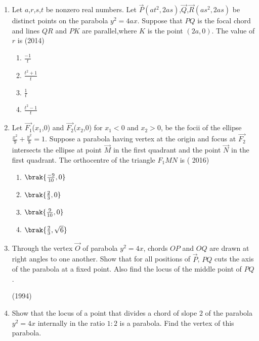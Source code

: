 \begin{enumerate}[label=\thesubsection.\arabic*.,ref=\thesubsection.\theenumi]
\begin{multicols}{4}
\begin{enumerate}
    \item $\frac{-2}{3}\sqrt{5}$
\end{enumerate}
\end{multicols}
\item Let $a$,$r$,$s$,$t$ be nonzero real numbers. Let $\Vec{P}$$(at^2,2as)$,$\Vec{Q}$,$\Vec{R}$$(as^2,2as)$ be distinct points on the parabola $y^2=4ax$. Suppose that $PQ$ is the focal chord and lines $QR$ and $PK$ are parallel,where $K$ is the point $(2a,0)$.
 The value of $r$ is 
\hfill(2014)
\begin{multicols}{4}
\begin{enumerate}
    \item $\frac{-1}{t}$ 
    \item $\frac{t^2+1}{t}$
    \item $\frac{1}{t}$
    \item $\frac{t^2-1}{t}$
\end{enumerate}
\end{multicols}
\item Let $\vec{F_1}$($x_1$,0) and  $\vec{F_2}$($x_2$,0) for $x_1<0$ and $x_2>0$, be the focii of the ellipse $\frac{x^2}{9}+\frac{y^2}{8} =1$. Suppose a parabola having vertex at the origin and focus at $\vec{F_2}$ intersects the ellipse at point $\Vec{M}$ in the first quadrant and the point $\Vec{N}$ in the first quadrant.
The orthocentre of the triangle $F_1MN$ is
         \hfill( 2016)
\begin{multicols}{4}
\begin{enumerate}
	\item $\brak{\frac{-9}{10},0}$   
	\item $\brak{\frac{2}{3},0}$     
	\item $\brak{\frac{9}{10},0}$ 
     \item $\brak{\frac{2}{3},\sqrt{6}}$ 
    \end{enumerate}
\end{multicols}
		
      \item Through the vertex $\vec{O}$ of parabola $y^2=4x$, chords $OP$ and $OQ$ are drawn at right angles to one another. Show that for all positions of $\vec{P}$, $PQ$ cuts the axis of the parabola at a fixed point. Also find the locus of the middle point of $PQ$. 

		\hfill(1994)
		
      \item Show that the locus of a point that divides a chord of slope $2$ of the parabola $y^2=4x$ internally in the ratio $1:2$ is a parabola. Find the vertex of this parabola. 


\end{enumerate}
